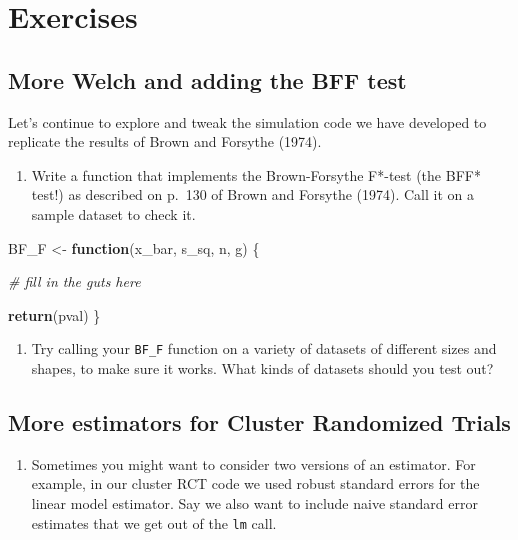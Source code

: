 \documentclass[
]{book}
\newenvironment{Shaded}{\begin{snugshade}}{\end{snugshade}}
\newcommand{\CommentTok}[1]{\textcolor[rgb]{0.56,0.35,0.01}{\textit{#1}}}
\newcommand{\ControlFlowTok}[1]{\textcolor[rgb]{0.13,0.29,0.53}{\textbf{#1}}}
\newcommand{\FunctionTok}[1]{\textcolor[rgb]{0.13,0.29,0.53}{\textbf{#1}}}
\newcommand{\NormalTok}[1]{#1}
\newcommand{\OtherTok}[1]{\textcolor[rgb]{0.56,0.35,0.01}{#1}}
\providecommand{\tightlist}{%
  \setlength{\itemsep}{0pt}\setlength{\parskip}{0pt}}
\begin{document}
\section{Exercises}\label{exercises-3}

\subsection{More Welch and adding the BFF test}\label{more-welch-and-adding-the-bff-test}

Let's continue to explore and tweak the simulation code we have developed to replicate the results of Brown and Forsythe (1974).

\begin{enumerate}
\def\labelenumi{\arabic{enumi}.}
\tightlist
\item
  Write a function that implements the Brown-Forsythe F*-test (the BFF* test!) as described on p.~130 of Brown and Forsythe (1974).
  Call it on a sample dataset to check it.
\end{enumerate}

\begin{Shaded}
\begin{Highlighting}[]
\NormalTok{BF\_F }\OtherTok{\textless{}{-}} \ControlFlowTok{function}\NormalTok{(x\_bar, s\_sq, n, g) \{}
  
  \CommentTok{\# fill in the guts here}
  
  \FunctionTok{return}\NormalTok{(pval)}
\NormalTok{\}}
\end{Highlighting}
\end{Shaded}

\begin{enumerate}
\def\labelenumi{\arabic{enumi}.}
\setcounter{enumi}{1}
\tightlist
\item
  Try calling your \texttt{BF\_F} function on a variety of datasets of different sizes and shapes, to make sure it works. What kinds of datasets should you test out?
\end{enumerate}

\subsection{More estimators for Cluster Randomized Trials}\label{more-estimators-for-cluster-randomized-trials}

\begin{enumerate}
\def\labelenumi{\arabic{enumi}.}
\setcounter{enumi}{2}
\tightlist
\item
  Sometimes you might want to consider two versions of an estimator. For example, in our cluster RCT code we used robust standard errors for the linear model estimator. Say we also want to include naive standard error estimates that we get out of the \texttt{lm} call.
\end{enumerate}
\end{document}
